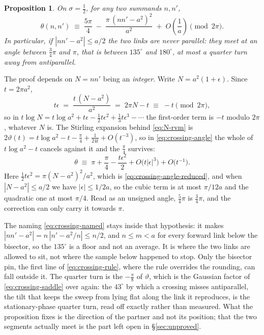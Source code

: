 \documentclass[11pt]{article}
\newtheorem{proposition}[theorem]{Proposition}
\theoremstyle{definition}
\begin{document}
\begin{proposition}\label{prop:crossing-angle}
On $\sigma=\tfrac12$, for any two summands $n,n'$,
\begin{equation}\label{eq:crossing-angle-reduced}
\theta(n,n')
\;\equiv\;
\frac{5\pi}{4}\;-\;\frac{\pi\,(nn'-a^{2})^{2}}{a^{2}}
\;+\;O\!\left(\frac1a\right)
\pmod{2\pi}.
\end{equation}
In particular, if $|nn'-a^{2}|\leq a/2$ the two links are never parallel: they
meet at an angle between $\tfrac34\pi$ and $\pi$, that is between $135^{\circ}$
and $180^{\circ}$, at most a quarter turn away from antiparallel.
\end{proposition}

The proof depends on $N=nn'$ being an \emph{integer}. Write $N=a^{2}(1+\epsilon)$.
Since $t=2\pi a^{2}$,
\begin{equation}\label{eq:crossing-angle-integrality}
t\epsilon\;=\;\frac{t\,(N-a^{2})}{a^{2}}\;=\;2\pi N-t\;\equiv\;-t\pmod{2\pi},
\end{equation}
so in
$t\log N=t\log a^{2}+t\epsilon-\tfrac12t\epsilon^{2}+\tfrac13t\epsilon^{3}-\cdots$
the first-order term is $-t$ modulo $2\pi$, whatever $N$ is. The Stirling
expansion behind \eqref{eq:N-rvm} is
$2\vartheta(t)=t\log a^{2}-t-\tfrac{\pi}{4}+\tfrac{1}{24t}+O(t^{-3})$, so in
\eqref{eq:crossing-angle} the whole of $t\log a^{2}-t$ cancels against it and
the $\tfrac\pi4$ survives:
\[
\theta\;\equiv\;\pi+\frac{\pi}{4}-\frac{t\epsilon^{2}}{2}
+O\bigl(t|\epsilon|^{3}\bigr)+O\bigl(t^{-1}\bigr).
\]
Here $\tfrac12t\epsilon^{2}=\pi(N-a^{2})^{2}/a^{2}$, which is \eqref{eq:crossing-angle-reduced},
and when $|N-a^{2}|\leq a/2$ we have $|\epsilon|\leq1/2a$, so the cubic term is
at most $\pi/12a$ and the quadratic one at most $\pi/4$. Read as an unsigned
angle, $\tfrac54\pi$ is $\tfrac34\pi$, and the correction can only carry it
towards $\pi$.

The naming \eqref{eq:crossing-named} stays inside that hypothesis: it makes
$|nn'-a^{2}|=n\,|n'-a^{2}/n|\leq n/2$, and $n\leq m<a$ for every forward link
below the bisector, so the $135^{\circ}$ is a floor and not an average. It is
where the two links are allowed to sit, not where the sample below happened to
stop. Only the
bisector pin, the first line of \eqref{eq:crossing-rule}, where the rule
overrides the rounding, can fall outside it. The quarter turn is the
$-\tfrac\pi8$ of $\vartheta$, which is the Gaussian factor of
\eqref{eq:crossing-saddle} over again: the $43^{\circ}$ by which a crossing
misses antiparallel, the tilt that keeps the sweep from lying flat along the
link it reproduces, is the stationary-phase quarter turn, read off exactly
rather than measured. What the proposition fixes is the direction of the
partner and not its position; that the two segments actually meet is the part
left open in \S\ref{sec:unproved}.
\end{document}
